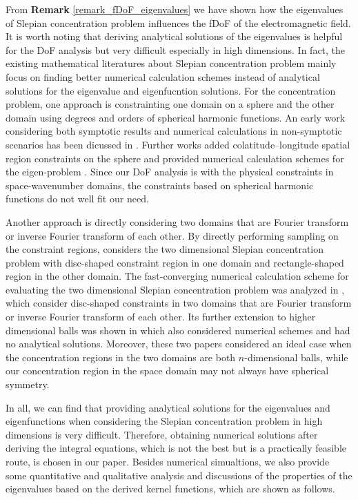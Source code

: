 \documentclass[12pt,draftclsnofoot,journal,onecolumn]{IEEEtran}
\begin{document}
{\color{red}
	From {\bf Remark} \ref{remark_fDoF_eigenvalues} we have shown how the eigenvalues of Slepian concentration problem influences the fDoF of the electromagnetic field. It is worth noting that deriving analytical solutions of the eigenvalues is helpful for the DoF analysis but very difficult especially in high dimensions. In fact, the existing mathematical literatures about Slepian concentration problem mainly focus on finding better numerical calculation schemes instead of analytical solutions for the eigenvalue and eigenfucntion solutions. 
	For the concentration problem, one approach is constrainting one domain on a sphere and the other domain using degrees and orders of spherical harmonic functions. An early work considering both symptotic results and numerical calculations in non-symptotic scenarios has been dicussed in \cite{simons2006spatiospectral}. Further works added colatitude–longitude spatial region constraints on the sphere and provided numerical calculation schemes for the eigen-problem \cite{bates2016slepian}. Since our DoF analysis is with the physical constraints in space-wavenumber domains, the constraints based on spherical harmonic functions do not well fit our need. 
	
	Another approach is directly considering two domains that are Fourier transform or inverse Fourier transform of each other. By directly performing sampling on the constraint regions, \cite{beylkin2007grids} considers the two dimensional Slepian concentration problem with disc-shaped constraint region in one domain and rectangle-shaped region in the other domain.
	The fast-converging numerical calculation scheme for evaluating the two dimensional Slepian concentration problem was analyzed in \cite{shkolnisky2007prolate}, which consider disc-shaped constraints in two domains that are Fourier transform or inverse Fourier transform of each other. 
	Its further extension to higher dimensional balls was shown in \cite{zhang2020ball} which also considered numerical schemes and had no analytical solutions. Moreover, these two papers considered an ideal case when the concentration regions in the two domains are both $n$-dimensional balls, while our concentration region in the space domain may not always have spherical symmetry. 
	
	In all, we can find that providing analytical solutions for the eigenvalues and eigenfunctions when considering the Slepian concentration problem in high dimensions is very difficult. Therefore, obtaining numerical solutions after deriving the integral equations, which is not the best but is a practically feasible route, is chosen in our paper. Besides numerical simualtions, we also provide some quantitative and qualitative analysis and discussions of the properties of the eigenvalues based on the derived kernel functions, which are shown as follows.

}
\end{document}
